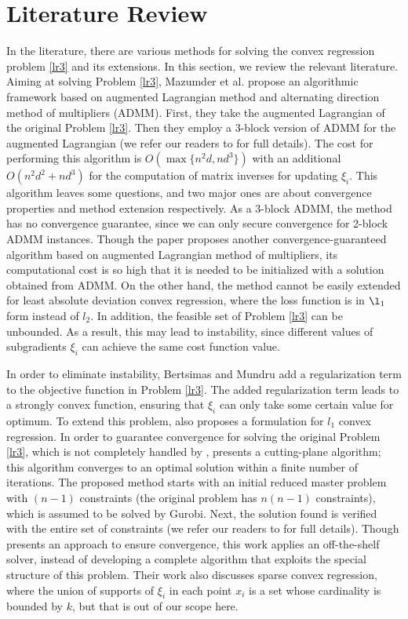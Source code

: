 \documentclass{article}
\begin{document}
\section{Literature Review} \label{s3}
In the literature, there are various methods for solving the convex regression problem \eqref{lr3} and its extensions. In this section, we review the relevant literature. Aiming at solving Problem \eqref{lr3}, Mazumder et al. \cite{Mazumder18} propose an algorithmic framework based on augmented Lagrangian method and alternating direction method of multipliers (ADMM). First, they take the augmented Lagrangian of the original Problem \eqref{lr3}. Then they employ a 3-block version of ADMM for the augmented Lagrangian (we refer our readers to \cite{Mazumder18} for full details). The cost for performing this algorithm is $O(\max\{n^2d,nd^3\})$ with an additional $O(n^2d^2+nd^3)$ for the computation of matrix inverses for updating $\xi_i$. This algorithm leaves some questions, and two major ones are about convergence properties and method extension respectively. As a 3-block ADMM, the method has no convergence guarantee, since we can only secure convergence for 2-block ADMM instances. Though the paper proposes another convergence-guaranteed algorithm based on augmented Lagrangian method of multipliers, its computational cost is so high that it is needed to be initialized with a solution obtained from ADMM. On the other hand, the method cannot be easily extended for least absolute deviation convex regression, where the loss function is in $\l_1$ form instead of $l_2$. In addition, the feasible set of Problem \eqref{lr3} can be unbounded. As a result, this may lead to instability, since different values of subgradients $\xi_i$ can achieve the same cost function value. 

In order to eliminate instability, Bertsimas and Mundru \cite{Bertsimas20} add a regularization term to the objective function in Problem \eqref{lr3}. The added regularization term leads to a strongly convex function, ensuring that $\xi_i$ can only take some certain value for optimum. To extend this problem, \cite{Bertsimas20} also proposes a formulation for $l_1$ convex regression. In order to guarantee convergence for solving the original Problem \eqref{lr3}, which is not completely handled by \cite{Mazumder18}, \cite{Bertsimas20} presents a cutting-plane algorithm; this algorithm converges to an optimal solution within a finite number of iterations. The proposed method starts with an initial reduced master problem with $(n-1)$ constraints (the original problem has $n(n-1)$ constraints), which is assumed to be solved by Gurobi. Next, the solution found is verified with the entire set of constraints (we refer our readers to \cite{Bertsimas20} for full details). Though \cite{Bertsimas20} presents an approach to ensure convergence, this work applies an off-the-shelf solver, instead of developing a complete algorithm that exploits the special structure of this problem. Their work also discusses sparse convex regression, where the union of supports of $\xi_i$ in each point $x_i$ is a set whose cardinality is bounded by $k$, but that is out of our scope here.
\end{document}
